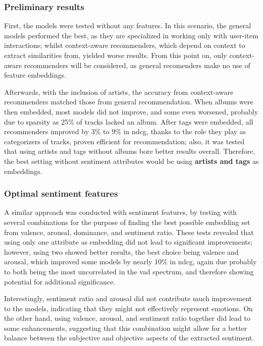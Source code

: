 \subsubsection{Preliminary results}

First, the models were tested without any features. In this scenario, the general models performed the best, as they are specialized in working only with user-item interactions; whilst context-aware recommenders, which depend on context to extract similarities from, yielded worse results. From this point on, only context-aware recommenders will be considered, as general recomenders make no use of feature embeddings.

Afterwards, with the inclusion of artists, the accuracy from context-aware recommenders matched those from general recommendation. When albums were then embedded, most models did not improve, and some even worsened, probably due to sparsity as 25\% of tracks lacked an album. After tags were embedded, all recommenders improved by 3\% to 9\% in \acs{ndcg}, thanks to the role they play as categorizers of tracks, proven efficient for recommendation; also, it was tested that using artists and tags without albums bore better results overall. Therefore, the best setting without sentiment attributes would be using \textbf{artists and tags} as embeddings.

\subsubsection{Optimal sentiment features}

A similar approach was conducted with sentiment features, by testing with several combinations for the purpose of finding the best possible embedding set from valence, arousal, dominance, and sentiment ratio. These tests revealed that using only one attribute as embedding did not lead to significant improvements; however, using two showed better results, the best choice being valence and arousal, which improved some models by nearly 10\% in \acs{ndcg}, again due probably to both being the most uncorrelated in the \acs{vad} spectrum, and therefore showing potential for additional significance.

Interestingly, sentiment ratio and arousal did not contribute much improvement to the models, indicating that they might not effectively represent emotions. On the other hand, using valence, arousal, and sentiment ratio together did lead to some enhancements, suggesting that this combination might allow for a better balance between the subjective and objective aspects of the extracted sentiment.

